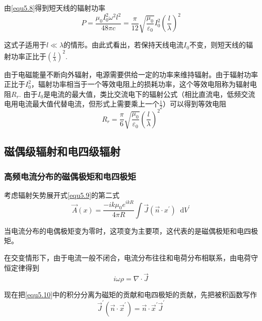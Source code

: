 \documentclass[UTF8]{ctexart}
\newcommand*{\dif}{\mathop{}\!\mathrm{d}}
\begin{document}
\noindent 由\autoref{equ5.8}得到短天线的辐射功率
\begin{equation}
    P = \frac{\mu_0 I_0^2 \omega^2 l^2}{48 \pi c} = \frac{\pi}{12} \sqrt{\frac{\mu_0}{\varepsilon_0}}I_0^2 \left(\frac{l}{\lambda}\right)^2
\end{equation}

\noindent 这式子适用于$l \ll \lambda$的情形。由此式看出，若保持天线电流$I_0$不变，则短天线的辐射功率正比于$\left(\frac{l}{\lambda}\right)^2$.

    由于电磁能量不断向外辐射，电源需要供给一定的功率来维持辐射。由于辐射功率正比于$I_0^2$，辐射功率相当于一个等效电阻上的损耗功率，这个等效电阻称为辐射电阻$R_r$. 由于$I_0$是电流的最大值，类比交流电下的辐射公式（相比直流电，低频交流电用电流最大值代替电流，但形式上需要乘上一个$\frac{1}{2}$）可以得到等效电阻
    \begin{equation}
        R_r = \frac{\pi}{6} \sqrt{\frac{\mu_0}{\varepsilon_0}} \left(\frac{l}{\lambda}\right)^2
    \end{equation}

    \subsection{磁偶级辐射和电四级辐射}
    \subsubsection{高频电流分布的磁偶极矩和电四极矩}
    考虑辐射矢势展开式\autoref{equ5.9}的第二式
    \begin{equation}
        \vec{A}(x) = \frac{-i k \mu_0 e^{ikR}}{4 \pi R} \int \vec{J} (\vec{n} \cdot x^{\prime}) \dif V^{\prime}\label{equ5.10}
    \end{equation}

\noindent 当电流分布的电偶极矩变为零时，这项变为主要项，这代表的是磁偶极矩和电四极矩。

    在交变情形下，由于电流一般不闭合，电流分布往往和电荷分布相联系，由电荷守恒定律得到
    \begin{equation}
        i \omega \rho = \nabla \cdot \vec{J}
    \end{equation}

    现在把\autoref{equ5.10}中的积分分离为磁矩的贡献和电四极矩的贡献，先把被积函数写作
    \begin{equation}
        \vec{J}^{\prime}(\vec{n} \cdot \vec{x}^{\prime}) = \vec{n} \cdot \vec{x}^{\prime} \vec{J}^{\prime}
    \end{equation}
\end{document}
